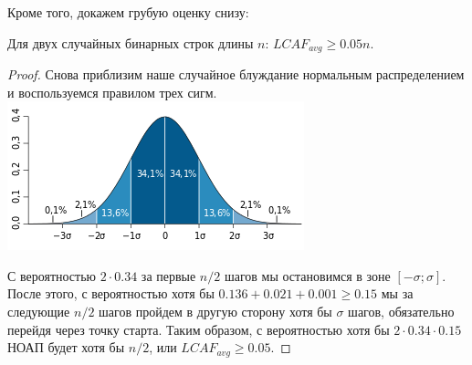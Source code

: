Кроме того, докажем грубую оценку снизу:
\begin{theorem}
Для двух случайных бинарных строк длины $n$: $LCAF_{avg} \ge 0.05n$.
\end{theorem}
\begin{proof}
Снова приблизим наше случайное блуждание нормальным распределением и воспользуемся правилом трех сигм.
\includegraphics[scale=1]{pics/3sigm.png}

С вероятностью $2 \cdot 0.34$ за первые $n/2$ шагов мы остановимся в зоне $[-\sigma; \sigma]$. После этого, с вероятностью хотя бы $0.136+0.021+0.001 \ge 0.15$ мы за следующие $n/2$ шагов пройдем в другую сторону хотя бы $\sigma$ шагов, обязательно перейдя через точку старта. Таким образом, с вероятностью хотя бы $2 \cdot 0.34 \cdot 0.15$ НОАП будет хотя бы $n/2$, или $LCAF_{avg} \ge 0.05$.

\end{proof}

